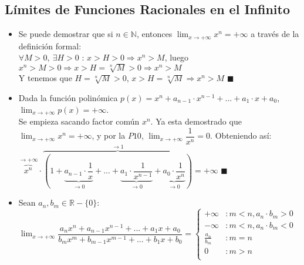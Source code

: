 \documentclass[11pt,a4paper]{article}
\newcommand*{\QEDA}{\null\nobreak\hfill\ensuremath{\blacksquare}}
\begin{document}
\subsection{L\'imites de Funciones Racionales en el Infinito}
\begin{itemize}
\item Se puede demostrar que si $n \in \mathbb{N}$, entonces $\displaystyle{\lim_{x \to +\infty} x^n = +\infty}$ a trav\'es de la definici\'on formal:\\
$\forall M > 0,\ \exists H>0$ : $x > H > 0 \Rightarrow x^n > M$, luego $x^n > M > 0 \Rightarrow x > H = \sqrt[n]{M} > 0 \Rightarrow x^n > M$\\
Y tenemos que $H = \sqrt[n]{M} > 0$, $x>H=\sqrt[n]{M} \Rightarrow x^n>M$ \QEDA\\

\item Dada la funci\'on polin\'omica $p(x)=x^n+a_{n-1} \cdot x^{n-1}+...+a_1 \cdot x + a_0$, $\displaystyle{\lim_{x \to +\infty} p(x) = +\infty}$. \\
Se empieza sacando factor com\'un $x^n$. Ya esta demostrado que $\displaystyle{\lim_{x \to +\infty} x^n = +\infty}$, y por la $P10$, $\displaystyle{\lim_{x \to +\infty} \dfrac{1}{x^n} = 0}$. Obteniendo as\'i: $\overbrace{x^n}^{\to +\infty}\cdot \overbrace{(1+ \underbrace{a_{n-1} \cdot \dfrac{1}{x}}_{\to 0}+...+\underbrace{a_1 \cdot \dfrac{1}{x^{n-1}}}_{\to 0} + \underbrace{a_0 \cdot \dfrac{1}{x^n}}_{\to 0})}^{\to 1} = +\infty$ \QEDA\\

\item Sean $a_n, b_m \in \mathbb{R} - \{0\}$: \\
$\displaystyle{\lim_{x \to +\infty} \dfrac{a_nx^n + a_{n-1}x^{n-1} + ... + a_1x + a_0}{b_mx^m + b_{m-1}x^{m-1} + ... + b_1x + b_0} = } \left\{\begin{array}{ll}
+\infty &: m<n, a_n\cdot b_m > 0\\
-\infty &: m<n, a_n\cdot b_m < 0\\
\frac{a_n}{b_m} &: m=n\\
0 &: m>n\\
\end{array}\right.
$


\end{itemize}
\end{document}
